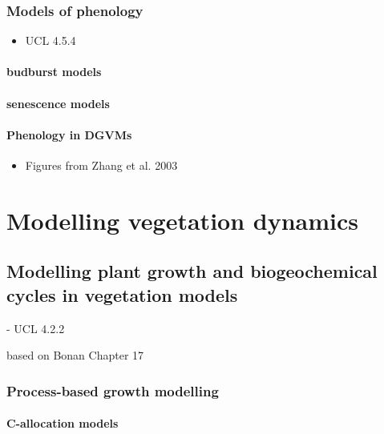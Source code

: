\documentclass[12pt,oneside]{book}
\providecommand{\tightlist}{%
  \setlength{\itemsep}{0pt}\setlength{\parskip}{0pt}}
\begin{document}
\section{Models of phenology}\label{models-of-phenology}

\begin{itemize}
\tightlist
\item
  UCL 4.5.4
\end{itemize}

\subsection{budburst models}\label{budburst-models}

\subsection{senescence models}\label{senescence-models}

\subsection{Phenology in DGVMs}\label{phenology-in-dgvms}

\begin{itemize}
\tightlist
\item
  Figures from Zhang et al. 2003
\end{itemize}

\part{Modelling vegetation
dynamics}\label{part-modelling-vegetation-dynamics}

\chapter{Modelling plant growth and biogeochemical cycles in vegetation
models}\label{modelling-plant-growth-and-biogeochemical-cycles-in-vegetation-models}

 - UCL 4.2.2

based on Bonan Chapter 17

\section{Process-based growth
modelling}\label{process-based-growth-modelling}

\subsection{C-allocation models}\label{c-allocation-models}
\end{document}
